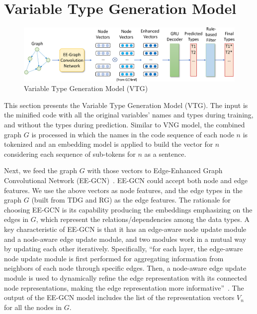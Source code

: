 \section{Variable Type Generation Model}
\label{sec:type-gen}

\begin{figure}[ht]
	\begin{center}
	  \includegraphics[width=4.8in]{figures/type-gen-model-2}
          \vspace{-6pt}
		\caption{Variable Type Generation Model (VTG)}
		\label{fig:type-gen}
	\end{center}
\end{figure}

This section presents the Variable Type Generation Model (VTG).  The
input is the minified code with all the original variables' names and
types during training, and without the types during
prediction. Similar to VNG model, the combined graph $G$ is processed
in which the names in the code sequence of each node $n$ is tokenized
and an embedding model is applied to build the vector for $n$
considering each sequence of sub-tokens for $n$ as a sentence.


Next, we feed the graph $G$ with those vectors to Edge-Enhanced Graph
Convolutional Network (EE-GCN)~\cite{ee-gcn}. EE-GCN could accept both
node and edge features.  We use the above vectors as node features,
and the edge types in the graph $G$ (built from TDG and RG) as
the edge features.
%
The rationale for choosing EE-GCN is its capability producing the
embeddings emphasizing on the edges in $G$, which represent the
relations/dependencies among the data types.
%
A key characteristic of EE-GCN is that it has an edge-aware node
update module and a node-aware edge update module, and two modules
work in a mutual way by updating each other iteratively. Specifically,
``for each layer, the edge-aware node update module is first performed
for aggregating information from neighbors of each node through
specific edges. Then, a node-aware edge update module is used to
dynamically refine the edge representation with its connected node
representations, making the edge representation more
informative''~\cite{ee-gcn}.
The output of the EE-GCN model includes the list of the representation
vectors $V_n$ for all the nodes in $G$.

